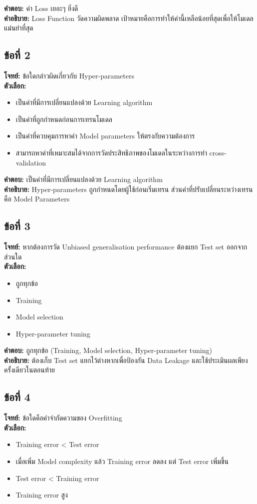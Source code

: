 \documentclass[12pt]{article}
\begin{document}
\textbf{คำตอบ:} ค่า Loss เยอะๆ ยิ่งดี\\
\textbf{คำอธิบาย:} Loss Function วัดความผิดพลาด เป้าหมายคือการทำให้ค่านี้เหลือน้อยที่สุดเพื่อให้โมเดลแม่นยำที่สุด

\subsection*{ข้อที่ 2}
\textbf{โจทย์:} ข้อใดกล่าวผิดเกี่ยวกับ Hyper-parameters\\
\textbf{ตัวเลือก:}
\begin{itemize}
    \item เป็นค่าที่มีการเปลี่ยนแปลงด้วย Learning algorithm
    \item เป็นค่าที่ถูกกำหนดก่อนการเทรนโมเดล
    \item เป็นค่าที่ควบคุมการหาค่า Model parameters ให้ตรงกับความต้องการ
    \item สามารถหาค่าที่เหมาะสมได้จากการวัดประสิทธิภาพของโมเดลในระหว่างการทำ cross-validation
\end{itemize}

\textbf{คำตอบ:} เป็นค่าที่มีการเปลี่ยนแปลงด้วย Learning algorithm\\
\textbf{คำอธิบาย:} Hyper-parameters ถูกกำหนดโดยผู้ใช้ก่อนเริ่มเทรน ส่วนค่าที่ปรับเปลี่ยนระหว่างเทรนคือ Model Parameters

\subsection*{ข้อที่ 3}
\textbf{โจทย์:} หากต้องการวัด Unbiased generalisation performance ต้องแยก Test set ออกจากส่วนใด\\
\textbf{ตัวเลือก:}
\begin{itemize}
    \item ถูกทุกข้อ
    \item Training
    \item Model selection
    \item Hyper-parameter tuning
\end{itemize}

\textbf{คำตอบ:} ถูกทุกข้อ (Training, Model selection, Hyper-parameter tuning)\\
\textbf{คำอธิบาย:} ต้องเก็บ Test set แยกไว้ต่างหากเพื่อป้องกัน Data Leakage และใช้ประเมินผลเพียงครั้งเดียวในตอนท้าย

\subsection*{ข้อที่ 4}
\textbf{โจทย์:} ข้อใดคือคำจำกัดความของ Overfitting\\
\textbf{ตัวเลือก:}
\begin{itemize}
    \item Training error < Test error
    \item เมื่อเพิ่ม Model complexity แล้ว Training error ลดลง แต่ Test error เพิ่มขึ้น
    \item Test error < Training error
    \item Training error สูง
\end{itemize}
\end{document}
